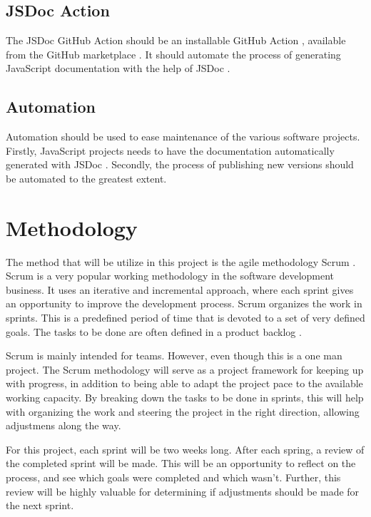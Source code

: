 \subsection{JSDoc Action}
The JSDoc GitHub Action should be an installable GitHub Action \cite{github-actions}, available from the GitHub marketplace \cite{github-marketplace}. It should automate the process of generating JavaScript documentation with the help of JSDoc \cite{jsdoc}.

\subsection{Automation}
Automation should be used to ease maintenance of the various software projects. Firstly, JavaScript projects needs to have the documentation automatically generated with JSDoc \cite{jsdoc}. Secondly, the process of publishing new versions should be automated to the greatest extent.

\section{Methodology}
The method that will be utilize in this project is the agile methodology Scrum \cite{scrum}. Scrum is a very popular working methodology in the software development business. It uses an iterative and incremental approach, where each sprint gives an opportunity to improve the development process. Scrum organizes the work in sprints. This is a predefined period of time that is devoted to a set of very defined goals. The tasks to be done are often defined in a product backlog \cite{product-backlog}.

Scrum is mainly intended for teams. However, even though this is a one man project. The Scrum methodology will serve as a project framework for keeping up with progress, in addition to being able to adapt the project pace to the available working capacity. By breaking down the tasks to be done in sprints, this will help with organizing the work and steering the project in the right direction, allowing adjustmens along the way.

For this project, each sprint will be two weeks long. After each spring, a review of the completed sprint will be made. This will be an opportunity to reflect on the process, and see which goals were completed and which wasn't. Further, this review will be highly valuable for determining if adjustments should be made for the next sprint.

